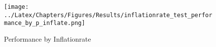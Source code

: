 
    \begin{figure}[H]
    \centering
    \texttt{[image: ../Latex/Chapters/Figures/Results/inflationrate\_test\_performance\_by\_p\_inflate.png]}
    \caption{Performance by Inflationrate}
    \label{fig:inflationrate_test_performance_by_p_inflate}
    \end{figure}
    